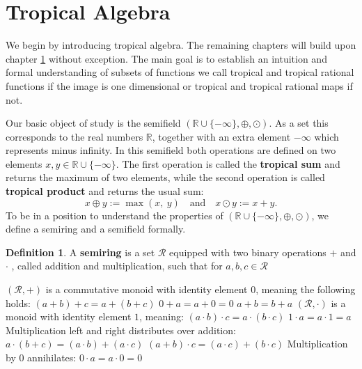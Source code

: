 \documentclass{article}
\theoremstyle{definition}
\newtheorem{definition}[theorem]{Definition}
\begin{document}
\section{Tropical Algebra}
\label{sec:trop_algebra}
We begin by introducing tropical algebra. The remaining chapters will build upon chapter \ref{sec:trop_algebra} without exception. The main goal is to establish an intuition and formal understanding of subsets of functions we call tropical and tropical rational functions if the image is one dimensional or tropical and tropical rational maps if not.

Our basic object of study is the semifield $( \mathbb{R} \cup \{- \infty \} , \oplus , \odot )$. As a set this corresponds to the real numbers $ \mathbb{R} $, together with an extra element $- \infty $ which represents minus infinity. In this semifield both operations are defined on two elements $x, y \in \mathbb{R} \cup \{- \infty \}$. The first operation is called the \textbf{tropical sum} and returns the maximum of two elements, while the second operation is called \textbf{tropical product} and returns the usual sum:
$$ x \oplus y := \max(x,\ y) \quad \text{and} \quad x \odot y := x+y.$$
To be in a position to understand the properties of $( \mathbb{R} \cup \{- \infty \} , \oplus , \odot )$, we define a semiring and a semifield formally.
\begin{definition}\cite{berstel1985theory}
A \textbf{semiring} is a set $\mathcal{R}$ equipped with two binary operations $+$ and $\cdot$ , called addition and multiplication, such that for $a, b, c \in \mathcal{R}$ \\
\begin{outline}
  \1 $(\mathcal{R}, +)$ is a commutative monoid with identity element 0, meaning the following holds:
    \2 $(a + b) + c = a + (b + c)$
    \2 $0 + a = a + 0 = 0$
    \2 $a + b = b + a$
  \1 $(\mathcal{R}, \cdot)$ is a monoid with identity element $1$, meaning:
    \2 $(a \cdot b) \cdot c = a \cdot (b \cdot c)$
    \2 $ 1 \cdot a = a \cdot 1 = a $
  \1 Multiplication left and right distributes over addition:
    \2 $ a \cdot (b + c) = (a \cdot b) + (a \cdot c)$
    \2 $ (a + b) \cdot c = (a \cdot c) + (b \cdot c)$
  \1 Multiplication by 0 annihilates:
    \2 $ 0 \cdot a = a \cdot 0 = 0$
\end{outline}
\end{definition}
\end{document}
